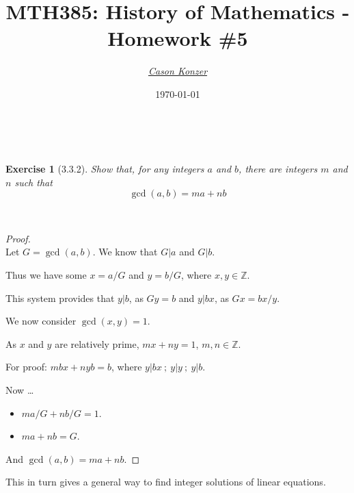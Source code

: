 \documentclass[12pt]{article}
\newcommand{\XB}{\color{black}}
\newcommand{\XBB}{\color{blue}}
\newcommand{\XV}{\color{violet}}
\newcommand{\ds}{\displaystyle}
\theoremstyle{plain}
\newtheorem{ex}{Exercise}
\begin{document}
\title{\textbf{MTH385}: History of Mathematics - Homework \#5}
\date{\today}
\author{\XV\textit{\large{\href{https://github.com/casonk}{Cason Konzer}}}\XB}

\maketitle

\hrulefill

\newpage

\XBB\hrulefill\XB \\
\begin{ex} [3.3.2]
  Show that, for any integers $ a $ and $ b $, there are integers $ m $ and $ n $ such that 
  \[
    \gcd(a, b) = ma + nb 
  \] 
\end{ex}
\XBB\hrulefill\XB \\

\begin{proof}
  \ \\

  Let $ G = \gcd(a, b) $.
  We know that $ G | a $ and $ G | b $.

  Thus we have some $ x = a/G $ and $ y = b/G $, where $ x, y \in \mathbb{Z} $.

  This system provides that $ y | b $, as $ Gy = b $ and $ y | bx $, as $ Gx = bx/y $.

  We now consider $ \gcd(x,y) = 1 $.

  As $ x $ and $ y $ are relatively prime, $ mx + ny = 1 $, $ m, n \in \mathbb{Z} $.

  For proof: $ mbx + nyb = b $, where $ y | bx \ ; \ y | y \ ; \ y | b $. 

  Now \dots

  \begin{itemize}
    \item $ \ds ma/G + nb/G = 1 $.
    \item $ \ds ma + nb = G $.
  \end{itemize}

  And $ \gcd(a, b) = ma + nb $.
\end{proof}

\vfill

\begin{center}
  This in turn gives a general way to find integer solutions of linear equations.
\end{center}
\end{document}
